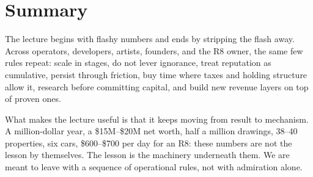 \section{Summary}

The lecture begins with flashy numbers and ends by stripping the flash away. Across operators, developers, artists, founders, and the R8 owner, the same few rules repeat: scale in stages, do not lever ignorance, treat reputation as cumulative, persist through friction, buy time where taxes and holding structure allow it, research before committing capital, and build new revenue layers on top of proven ones.

What makes the lecture useful is that it keeps moving from result to mechanism. A million-dollar year, a \$15M--\$20M net worth, half a million drawings, \(38\)--\(40\) properties, six cars, \$600--\$700 per day for an R8: these numbers are not the lesson by themselves. The lesson is the machinery underneath them. We are meant to leave with a sequence of operational rules, not with admiration alone.